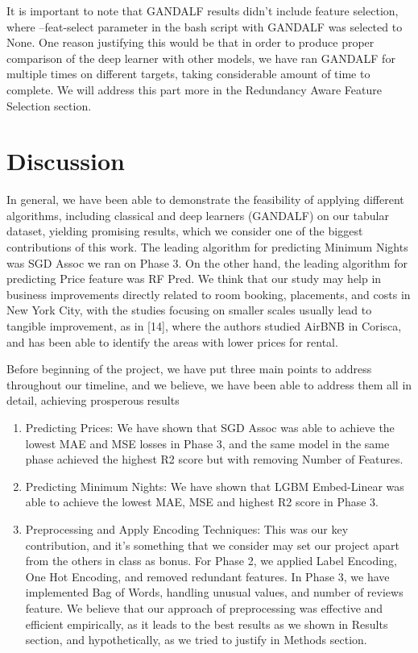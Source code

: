 \documentclass[a4paper,12pt]{article}
\begin{document}
It is important to note that GANDALF results didn't include feature selection, where --feat-select parameter in the bash script with GANDALF was selected to None. One reason justifying this would be that in order to produce proper comparison of the deep learner with other models, we have ran GANDALF for multiple times on different targets, taking considerable amount of time to complete. We will address this part more in the Redundancy Aware Feature Selection section.

\section*{Discussion}

In general, we have been able to demonstrate the feasibility of applying different algorithms, including classical and deep learners (GANDALF) on our tabular dataset, yielding promising results, which we consider one of the biggest contributions of this work. The leading algorithm for predicting Minimum Nights was SGD Assoc we ran on Phase 3. On the other hand, the leading algorithm for predicting Price feature was RF Pred. We think that our study may help in business improvements directly related to room booking, placements, and costs in New York City, with the studies focusing on smaller scales usually lead to tangible improvement, as in [14], where the authors studied AirBNB in Corisca, and has been able to identify the areas with lower prices for rental.

Before beginning of the project, we have put three main points to address throughout our timeline, and we believe, we have been able to address them all in detail, achieving prosperous results

\begin{enumerate}
    \item Predicting Prices: We have shown that SGD Assoc was able to achieve the lowest MAE and MSE losses in Phase 3, and the same model in the same phase achieved the highest R2 score but with removing Number of Features.

    \item Predicting Minimum Nights: We have shown that LGBM Embed-Linear was able to achieve the lowest MAE, MSE and highest R2 score in Phase 3.

    \item Preprocessing and Apply Encoding Techniques: This was our key contribution, and it's something that we consider may set our project apart from the others in class as bonus. For Phase 2, we applied Label Encoding, One Hot Encoding, and removed redundant features. In Phase 3, we have implemented Bag of Words, handling unusual values, and number of reviews feature. We believe that our approach of preprocessing was effective and efficient empirically, as it leads to the best results as we shown in Results section, and hypothetically, as we tried to justify in Methods section.
\end{enumerate}
\end{document}
